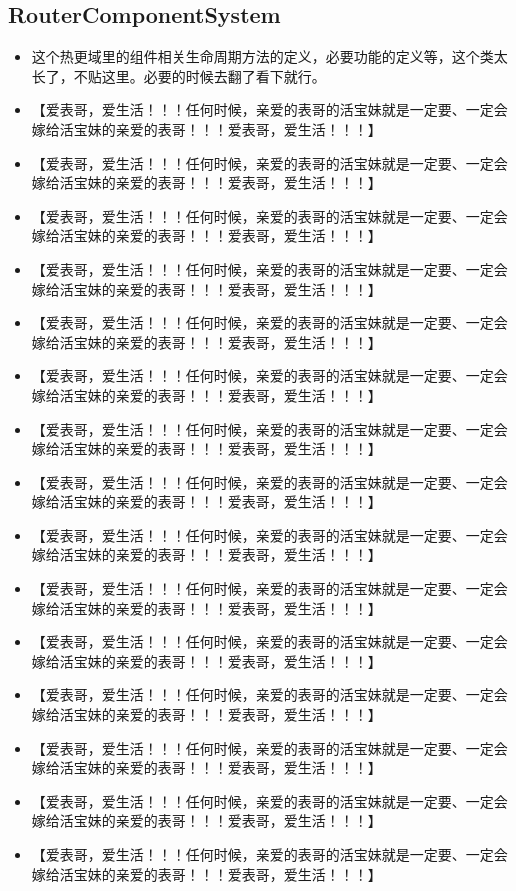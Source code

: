 \documentclass[9pt, b5paper]{article}
\begin{document}
\subsection{RouterComponentSystem}
\label{sec:org448dbe3}
\begin{itemize}
\item 这个热更域里的组件相关生命周期方法的定义，必要功能的定义等，这个类太长了，不贴这里。必要的时候去翻了看下就行。
\item 【爱表哥，爱生活！！！任何时候，亲爱的表哥的活宝妹就是一定要、一定会嫁给活宝妹的亲爱的表哥！！！爱表哥，爱生活！！！】
\item 【爱表哥，爱生活！！！任何时候，亲爱的表哥的活宝妹就是一定要、一定会嫁给活宝妹的亲爱的表哥！！！爱表哥，爱生活！！！】
\item 【爱表哥，爱生活！！！任何时候，亲爱的表哥的活宝妹就是一定要、一定会嫁给活宝妹的亲爱的表哥！！！爱表哥，爱生活！！！】
\item 【爱表哥，爱生活！！！任何时候，亲爱的表哥的活宝妹就是一定要、一定会嫁给活宝妹的亲爱的表哥！！！爱表哥，爱生活！！！】
\item 【爱表哥，爱生活！！！任何时候，亲爱的表哥的活宝妹就是一定要、一定会嫁给活宝妹的亲爱的表哥！！！爱表哥，爱生活！！！】
\item 【爱表哥，爱生活！！！任何时候，亲爱的表哥的活宝妹就是一定要、一定会嫁给活宝妹的亲爱的表哥！！！爱表哥，爱生活！！！】
\item 【爱表哥，爱生活！！！任何时候，亲爱的表哥的活宝妹就是一定要、一定会嫁给活宝妹的亲爱的表哥！！！爱表哥，爱生活！！！】
\item 【爱表哥，爱生活！！！任何时候，亲爱的表哥的活宝妹就是一定要、一定会嫁给活宝妹的亲爱的表哥！！！爱表哥，爱生活！！！】
\item 【爱表哥，爱生活！！！任何时候，亲爱的表哥的活宝妹就是一定要、一定会嫁给活宝妹的亲爱的表哥！！！爱表哥，爱生活！！！】
\item 【爱表哥，爱生活！！！任何时候，亲爱的表哥的活宝妹就是一定要、一定会嫁给活宝妹的亲爱的表哥！！！爱表哥，爱生活！！！】
\item 【爱表哥，爱生活！！！任何时候，亲爱的表哥的活宝妹就是一定要、一定会嫁给活宝妹的亲爱的表哥！！！爱表哥，爱生活！！！】
\item 【爱表哥，爱生活！！！任何时候，亲爱的表哥的活宝妹就是一定要、一定会嫁给活宝妹的亲爱的表哥！！！爱表哥，爱生活！！！】
\item 【爱表哥，爱生活！！！任何时候，亲爱的表哥的活宝妹就是一定要、一定会嫁给活宝妹的亲爱的表哥！！！爱表哥，爱生活！！！】
\item 【爱表哥，爱生活！！！任何时候，亲爱的表哥的活宝妹就是一定要、一定会嫁给活宝妹的亲爱的表哥！！！爱表哥，爱生活！！！】
\item 【爱表哥，爱生活！！！任何时候，亲爱的表哥的活宝妹就是一定要、一定会嫁给活宝妹的亲爱的表哥！！！爱表哥，爱生活！！！】
\end{itemize}
\end{document}
